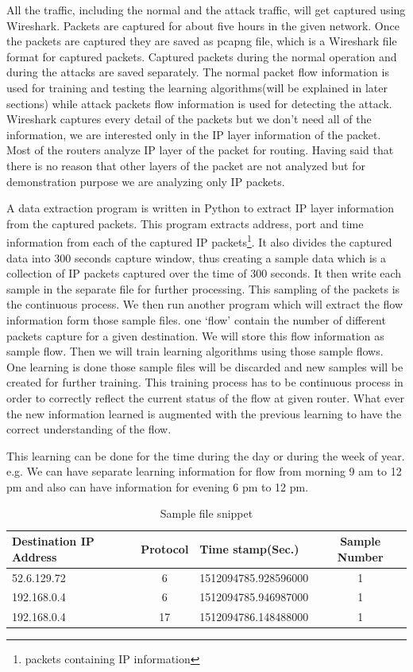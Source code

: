 \documentclass[12pt,oneside,a4paper]{article}
\begin{document}
All the traffic, including the normal and the attack traffic, will get captured using Wireshark. Packets are captured for about five hours in the given network. Once the packets are captured they are saved as pcapng file, which is a Wireshark file format for captured packets. Captured packets during the normal operation and during the attacks are saved separately. The normal packet flow information is used for training and testing the learning algorithms(will be explained in later sections) while attack packets flow information is used for detecting the attack. Wireshark captures every detail of the packets but we don't need all of the information, we are interested only in the IP layer information of the packet. Most of the routers analyze IP layer of the packet for routing. Having said that there is no reason that other layers of the packet are not analyzed but for demonstration purpose we are analyzing only IP packets.\par

 A data extraction program is written in Python to extract IP layer information from the captured packets. This program extracts address, port and time information from each of the captured IP packets\footnote{packets containing IP information}. It also divides the captured data into 300 seconds capture window, thus creating a sample data which is a collection of IP packets captured over the time of 300 seconds. It then write each sample in the separate file for further processing. This sampling of the packets is the continuous process. We then run another program which will extract the flow information form those sample files. one `flow' contain the number of different packets capture for a given destination. We will store this flow information as sample flow. Then we will train learning algorithms using those sample flows. One learning is done those sample files will be discarded and new samples will be created for further training. This training process has to be continuous process in order to correctly reflect the current status of the flow at given router. What ever the new information learned is augmented with the previous learning to have the correct understanding of the flow.

This learning can be done for the time during the day or during the week of year. e.g. We can have separate learning information for flow from morning 9 am to 12 pm and also can have information for evening 6 pm to 12 pm.

\begin{table}[H]
\centering
  \begin{tabular}{| l | c | l | c |}
    \hline
    Destination IP Address      & Protocol  & Time stamp(Sec.)  & Sample Number \\
    \hline
    52.6.129.72         & 6         & 1512094785.928596000  & 1 \\ \hline
    192.168.0.4         & 6         & 1512094785.946987000  & 1 \\ \hline
    192.168.0.4         & 17        & 1512094786.148488000  & 1 \\ \hline
  \end{tabular}
\caption{Sample file snippet} \label{table:sample-file-snippet}
\end{table}
\end{document}

